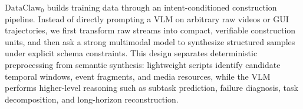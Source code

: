 \documentclass{llmxive}
\begin{document}













$\text{DataClaw}_0$ builds training data through an intent-conditioned construction pipeline. Instead of directly prompting a VLM on arbitrary raw videos or GUI trajectories, we first transform raw streams into compact, verifiable construction units, and then ask a strong multimodal model to synthesize structured samples under explicit schema constraints. This design separates deterministic preprocessing from semantic synthesis: lightweight scripts identify candidate temporal windows, event fragments, and media resources, while the VLM performs higher-level reasoning such as subtask prediction, failure diagnosis, task decomposition, and long-horizon reconstruction.
\end{document}
